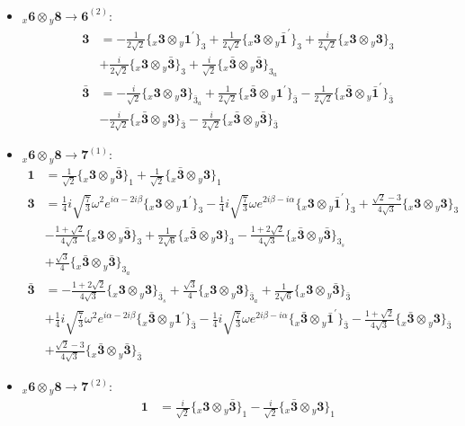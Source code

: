 \documentclass[english]{article}
\newcommand{\rep}[1]{\mathbf{#1}}
\newcommand{\repx}[2]{{}_{#2}\mathbf{#1}}
\newcommand{\subcg}[3]{\big\{ \repx{#1}{x}\otimes\repx{#2}{y}\big\}^{}_{#3}}
\begin{document}
\begin{itemize}
\begin{align*}
\end{align*}
\item $\repx{6}{x}\otimes\repx{8}{y}\to\rep{6}^{(2)}$:
\begin{align*}
\rep{3} & = -\frac{1}{2 \sqrt{2}}\subcg{3}{1^{\prime}}{3}+\frac{1}{2 \sqrt{2}}\subcg{3}{\bar{1}^{\prime}}{3}+\frac{i}{2 \sqrt{2}}\subcg{3}{3}{3} \\ 
 & +\frac{i}{2 \sqrt{2}}\subcg{3}{\bar{3}}{3}+\frac{i}{\sqrt{2}}\subcg{\bar{3}}{\bar{3}}{3_{a}}
\\
\rep{\bar{3}} & = -\frac{i}{\sqrt{2}}\subcg{3}{3}{\bar{3}_{a}}+\frac{1}{2 \sqrt{2}}\subcg{\bar{3}}{1^{\prime}}{\bar{3}}-\frac{1}{2 \sqrt{2}}\subcg{\bar{3}}{\bar{1}^{\prime}}{\bar{3}} \\ 
 & -\frac{i}{2 \sqrt{2}}\subcg{\bar{3}}{3}{\bar{3}}-\frac{i}{2 \sqrt{2}}\subcg{\bar{3}}{\bar{3}}{\bar{3}}
\end{align*}
\item $\repx{6}{x}\otimes\repx{8}{y}\to\rep{7}^{(1)}$:
\begin{align*}
\rep{1} & = \frac{1}{\sqrt{2}}\subcg{3}{\bar{3}}{1}+\frac{1}{\sqrt{2}}\subcg{\bar{3}}{3}{1}
\\
\rep{3} & = \frac{1}{4} i \sqrt{\frac{7}{3}} \omega ^2 e^{i \alpha -2 i \beta }\subcg{3}{1^{\prime}}{3}-\frac{1}{4} i \sqrt{\frac{7}{3}} \omega  e^{2 i \beta -i \alpha }\subcg{3}{\bar{1}^{\prime}}{3}+\frac{\sqrt{2}-3}{4 \sqrt{3}}\subcg{3}{3}{3} \\ 
 & -\frac{1+\sqrt{2}}{4 \sqrt{3}}\subcg{3}{\bar{3}}{3}+\frac{1}{2 \sqrt{6}}\subcg{\bar{3}}{3}{3}-\frac{1+2 \sqrt{2}}{4 \sqrt{3}}\subcg{\bar{3}}{\bar{3}}{3_{s}} \\ 
 & +\frac{\sqrt{3}}{4}\subcg{\bar{3}}{\bar{3}}{3_{a}}
\\
\rep{\bar{3}} & = -\frac{1+2 \sqrt{2}}{4 \sqrt{3}}\subcg{3}{3}{\bar{3}_{s}}+\frac{\sqrt{3}}{4}\subcg{3}{3}{\bar{3}_{a}}+\frac{1}{2 \sqrt{6}}\subcg{3}{\bar{3}}{\bar{3}} \\ 
 & +\frac{1}{4} i \sqrt{\frac{7}{3}} \omega ^2 e^{i \alpha -2 i \beta }\subcg{\bar{3}}{1^{\prime}}{\bar{3}}-\frac{1}{4} i \sqrt{\frac{7}{3}} \omega  e^{2 i \beta -i \alpha }\subcg{\bar{3}}{\bar{1}^{\prime}}{\bar{3}}-\frac{1+\sqrt{2}}{4 \sqrt{3}}\subcg{\bar{3}}{3}{\bar{3}} \\ 
 & +\frac{\sqrt{2}-3}{4 \sqrt{3}}\subcg{\bar{3}}{\bar{3}}{\bar{3}}
\end{align*}
\item $\repx{6}{x}\otimes\repx{8}{y}\to\rep{7}^{(2)}$:
\begin{align*}
\rep{1} & = \frac{i}{\sqrt{2}}\subcg{3}{\bar{3}}{1}-\frac{i}{\sqrt{2}}\subcg{\bar{3}}{3}{1}

\end{align*}
\end{itemize}
\end{document}
